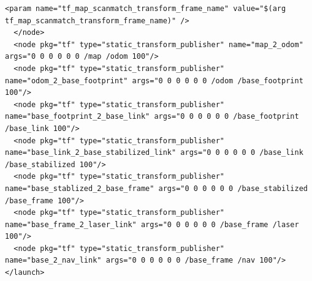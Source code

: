 \begin{lrbox}{\mybox}
\begin{lstlisting}[caption=Hector SLAMの座標系の設定,label=slam:s4]
    <param name="tf_map_scanmatch_transform_frame_name" value="$(arg tf_map_scanmatch_transform_frame_name)" />
  </node>
  <node pkg="tf" type="static_transform_publisher" name="map_2_odom" args="0 0 0 0 0 0 /map /odom 100"/>
  <node pkg="tf" type="static_transform_publisher" name="odom_2_base_footprint" args="0 0 0 0 0 0 /odom /base_footprint 100"/>
  <node pkg="tf" type="static_transform_publisher" name="base_footprint_2_base_link" args="0 0 0 0 0 0 /base_footprint /base_link 100"/> 
  <node pkg="tf" type="static_transform_publisher" name="base_link_2_base_stabilized_link" args="0 0 0 0 0 0 /base_link /base_stabilized 100"/> 
  <node pkg="tf" type="static_transform_publisher" name="base_stablized_2_base_frame" args="0 0 0 0 0 0 /base_stabilized /base_frame 100"/> 
  <node pkg="tf" type="static_transform_publisher" name="base_frame_2_laser_link" args="0 0 0 0 0 0 /base_frame /laser 100"/> 
  <node pkg="tf" type="static_transform_publisher" name="base_2_nav_link" args="0 0 0 0 0 0 /base_frame /nav 100"/>
</launch>
\end{lstlisting}
\end{lrbox}

